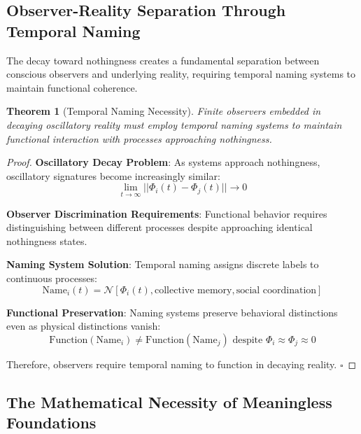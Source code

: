 \documentclass[12pt,a4paper]{article}
\newtheorem{theorem}{Theorem}
\begin{document}
\subsection{Observer-Reality Separation Through Temporal Naming}

The decay toward nothingness creates a fundamental separation between conscious observers and underlying reality, requiring temporal naming systems to maintain functional coherence.

\begin{theorem}[Temporal Naming Necessity]
Finite observers embedded in decaying oscillatory reality must employ temporal naming systems to maintain functional interaction with processes approaching nothingness.
\end{theorem}

\begin{proof}
\textbf{Oscillatory Decay Problem}: As systems approach nothingness, oscillatory signatures become increasingly similar:
\begin{equation}
\lim_{t \to \infty} ||\Phi_i(t) - \Phi_j(t)|| \to 0
\end{equation}

\textbf{Observer Discrimination Requirements}: Functional behavior requires distinguishing between different processes despite approaching identical nothingness states.

\textbf{Naming System Solution}: Temporal naming assigns discrete labels to continuous processes:
\begin{equation}
\text{Name}_i(t) = \mathcal{N}[\Phi_i(t), \text{collective memory}, \text{social coordination}]
\end{equation}

\textbf{Functional Preservation}: Naming systems preserve behavioral distinctions even as physical distinctions vanish:
\begin{equation}
\text{Function}(\text{Name}_i) \neq \text{Function}(\text{Name}_j) \text{ despite } \Phi_i \approx \Phi_j \approx 0
\end{equation}

Therefore, observers require temporal naming to function in decaying reality. $\square$
\end{proof}

\subsection{The Mathematical Necessity of Meaningless Foundations}
\end{document}

